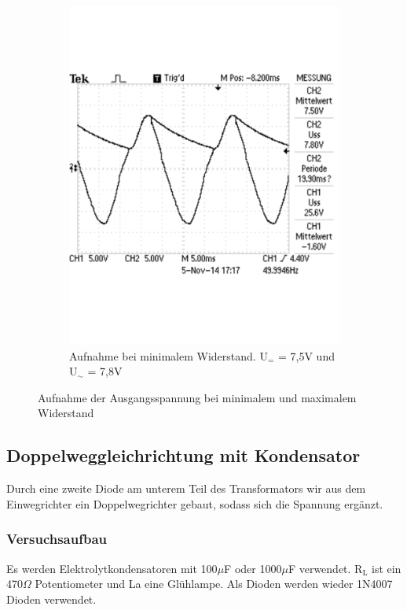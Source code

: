 \documentclass[12pt,a4paper]{article}
\begin{document}
\begin{figure}[H]
\begin{subfigure}[b]{0.48\textwidth}
                \includegraphics[width=\textwidth , scale = 0.4]{2_4_100F_2.pdf}
                \caption[Aufnahme bei minimalem Widerstand. U$_{=}$ = 7,5V und U$_\sim$ = 7,8V]{Aufnahme bei minimalem Widerstand. U$_{=}$ = 7,5V und U$_\sim$ = 7,8V}
  				\label{fig:2_4_1000F_2}
        \end{subfigure}
        \caption{Aufnahme der Ausgangsspannung bei minimalem und maximalem Widerstand}
        \label{fig:2_4_1000F}
\end{figure}

\subsection{Doppelweggleichrichtung mit Kondensator}

Durch eine zweite Diode am unterem Teil des Transformators wir aus dem Einwegrichter ein Doppelwegrichter gebaut, sodass sich die Spannung ergänzt.

\subsubsection{Versuchsaufbau}
Es werden Elektrolytkondensatoren mit 100$\mu$F oder 1000$\mu$F verwendet. R$_\text{L}$ ist ein 470$\Omega$ Potentiometer und La eine Glühlampe. Als Dioden werden wieder 1N4007 Dioden verwendet.
\end{document}
